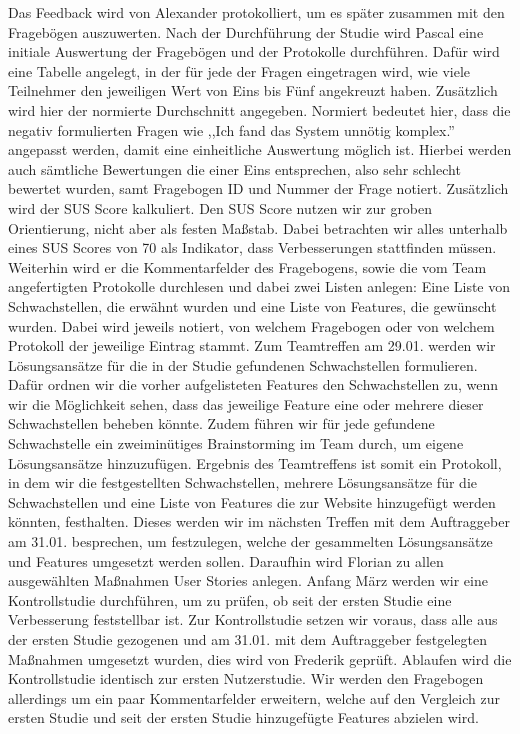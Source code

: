 \documentclass[accentcolor=tud0b,12pt,paper=a4]{tudreport}
\begin{document}
Das Feedback wird von Alexander protokolliert, um es später zusammen mit den Fragebögen auszuwerten. 
Nach der Durchführung der Studie wird Pascal eine initiale Auswertung der Fragebögen und der Protokolle  durchführen. Dafür wird eine Tabelle angelegt, in der für jede der Fragen eingetragen wird, wie viele Teilnehmer den jeweiligen Wert von Eins bis Fünf angekreuzt haben. Zusätzlich wird hier der normierte Durchschnitt angegeben. Normiert bedeutet hier, dass die negativ formulierten Fragen wie ,,Ich fand das System unnötig komplex.''  angepasst werden, damit eine einheitliche Auswertung möglich ist.
Hierbei werden auch sämtliche Bewertungen die einer Eins entsprechen, also sehr schlecht bewertet wurden, samt Fragebogen ID und Nummer der Frage notiert.
Zusätzlich wird der SUS Score kalkuliert. Den SUS Score nutzen wir zur groben Orientierung, nicht aber als festen Maßstab. Dabei betrachten wir alles unterhalb eines SUS Scores von 70 als Indikator, dass Verbesserungen stattfinden müssen.
Weiterhin wird er die Kommentarfelder des Fragebogens, sowie die vom Team angefertigten Protokolle durchlesen und dabei zwei Listen anlegen: Eine Liste von Schwachstellen, die erwähnt wurden und eine Liste von Features, die gewünscht wurden. Dabei wird jeweils notiert, von welchem Fragebogen oder von welchem Protokoll der jeweilige Eintrag stammt. 
Zum Teamtreffen am 29.01. werden wir Lösungsansätze für die in der Studie gefundenen Schwachstellen formulieren. Dafür ordnen wir die vorher aufgelisteten Features den Schwachstellen zu, wenn wir die Möglichkeit sehen, dass das jeweilige Feature eine oder mehrere dieser Schwachstellen beheben könnte. Zudem führen wir für jede gefundene Schwachstelle ein zweiminütiges Brainstorming im Team durch, um eigene Lösungsansätze hinzuzufügen.
Ergebnis des Teamtreffens ist somit ein Protokoll, in dem wir die festgestellten Schwachstellen, mehrere Lösungsansätze für die Schwachstellen und eine Liste von Features die zur Website hinzugefügt werden könnten, festhalten.
Dieses werden wir im nächsten Treffen mit dem Auftraggeber am 31.01. besprechen, um festzulegen, welche der gesammelten Lösungsansätze und Features umgesetzt werden sollen. Daraufhin wird Florian zu allen ausgewählten Maßnahmen User Stories anlegen.
Anfang März werden wir eine Kontrollstudie durchführen, um zu prüfen, ob seit der ersten Studie eine Verbesserung feststellbar ist. Zur Kontrollstudie setzen wir voraus, dass alle aus der ersten Studie gezogenen und am 31.01. mit dem Auftraggeber festgelegten Maßnahmen umgesetzt wurden, dies wird von Frederik geprüft. Ablaufen wird die Kontrollstudie identisch zur ersten Nutzerstudie. Wir werden den Fragebogen allerdings um ein paar Kommentarfelder erweitern, welche auf den Vergleich zur ersten Studie und seit der ersten Studie hinzugefügte Features abzielen wird. 
\end{document}
